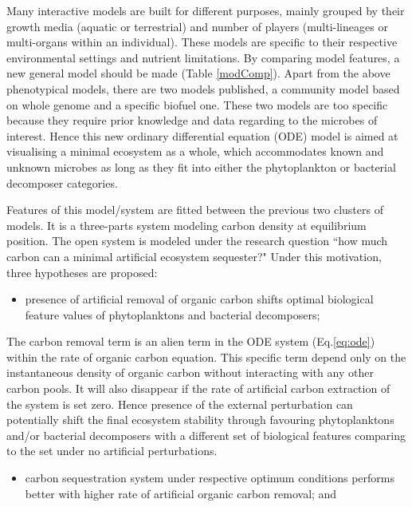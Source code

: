 \documentclass[../thesis.tex]{subfiles} %
\begin{document}
Many interactive models are built for different purposes, mainly grouped by their growth media (aquatic or terrestrial) and number of players (multi-lineages or multi-organs within an individual).  These models are specific to their respective environmental settings and nutrient limitations.  By comparing model features, a new general model should be made (Table \ref{modComp}).  Apart from the above phenotypical models, there are two models published, a community model based on whole genome\autocite{harcombe2014metabolic} and a specific biofuel\autocite{kirthiga2014mathematical} one.  These two models are too specific because they require prior knowledge and data regarding to the microbes of interest.  Hence this new ordinary differential equation (ODE) model is aimed at visualising a minimal ecosystem as a whole, which accommodates known and unknown microbes as long as they fit into either the phytoplankton or bacterial decomposer categories.

Features of this model/system are fitted between the previous two clusters of models.  It is a three-parts system modeling carbon density at equilibrium position.  The open system is modeled under the research question ``how much carbon can a minimal artificial ecosystem sequester?"  Under this motivation, three hypotheses are proposed:
\begin{itemize}
    \item presence of artificial removal of organic carbon shifts optimal biological feature values of phytoplanktons and bacterial decomposers;
\end{itemize}

The carbon removal term is an alien term in the ODE system (Eq.\ref{eq:ode}) within the rate of organic carbon equation.  This specific term depend only on the instantaneous density of organic carbon without interacting with any other carbon pools.  It will also disappear if the rate of artificial carbon extraction of the system is set zero.  Hence presence of the external perturbation can potentially shift the final ecosystem stability through favouring phytoplanktons and/or bacterial decomposers with a different set of biological features comparing to the set under no artificial perturbations.

\begin{itemize}
    \item carbon sequestration system under respective optimum conditions performs better with higher rate of artificial organic carbon removal;
    and
\end{itemize}
\end{document}
